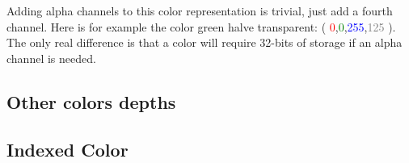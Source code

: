 \newcommand{\rgbaquad}[4]{(
  \textcolor{red}{#1},\textcolor{green}{#2},\textcolor{blue}{#3},\textcolor{gray}{#4} )}

Adding alpha channels to this color representation is trivial, just
add a fourth channel. Here is for example the color green halve
transparent: \rgbaquad{0}{0}{255}{125}. The only real difference is
that a color will require 32-bits of storage if an alpha channel is needed.

\subsection{Other colors depths}
\label{sec:other-colors-depths}

\subsection{Indexed Color}
\label{sec:indexed-color}


\printbibliography[heading=subbibliography]
